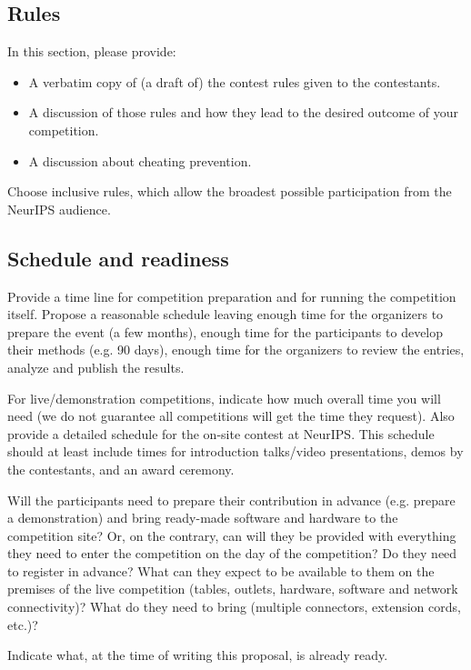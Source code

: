\documentclass[11pt, oneside]{article}
\begin{document}
\subsection{Rules}

In this section, please provide:

\begin{itemize}
	\item A verbatim copy of (a draft of) the contest rules given to the contestants. 
	\item A discussion of those rules and how they lead to the desired outcome of your competition. 
	\item A discussion about cheating prevention.
\end{itemize}

Choose inclusive rules, which allow the broadest possible participation from the NeurIPS audience. 

\subsection{Schedule and readiness}

Provide a time line for competition preparation and for running the competition itself. Propose a reasonable schedule leaving enough time for the organizers
to prepare the event (a few months), enough time for the participants to develop their methods (e.g. 90 days), enough time for the organizers to review the entries, analyze and publish the results. 

For live/demonstration competitions, indicate how much overall time you will need (we do not guarantee all competitions will get the time they request). Also provide a detailed schedule for the on-site contest at NeurIPS. This schedule should at least include times for introduction talks/video presentations, demos by the contestants, and an award ceremony. 

 Will the participants need to prepare their contribution in advance (e.g. prepare a demonstration) and bring ready-made software and hardware to the competition site? Or, on the contrary, can will they be provided with everything they need to enter the competition on the day of the competition? Do they need to register in advance? What can they expect to be available to them on the premises of the live competition (tables, outlets, hardware, software and network connectivity)? What do they need to bring (multiple connectors, extension cords, etc.)?


Indicate what, at the time of writing this proposal, is already ready.
\end{document}
